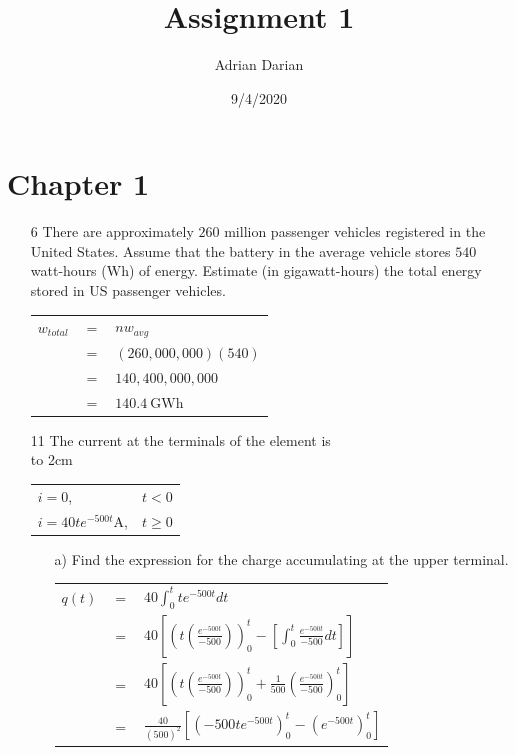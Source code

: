 \documentclass[a4paper]{article}
\title{Assignment 1}
\author{Adrian Darian}
\date{9/4/2020}
\newcommand\tab[1][0.5cm]{\hspace*{#1}}
\begin{document}
  
\maketitle
  
\section*{Chapter 1}
\begin{itemize}
	\item[6] There are approximately $260$ million passenger vehicles registered in the United States. Assume that the battery in the average vehicle stores $540$ watt-hours ($\si{\watt\hour}$) of energy. Estimate (in gigawatt-hours) the total energy stored in US passenger vehicles. \\
	      \begin{tabular}{r c l}
	      	$w_{total}$ & $=$ & $nw_{avg}$                    \\
	      	            & $=$ & $(260,000,000)(540)$          \\
	      	            & $=$ & $140,400,000,000$             \\
	      	            & $=$ & $\SI{140.4}{\giga\watt\hour}$ \\
	      \end{tabular} 
	\item[11] The current at the terminals of the element is \\
	      \hbox to 2cm{}
	      \tab\begin{tabular}{l c}
	      $i = 0$, & $t < 0$ \\
	      $i = 40te^{-500t}\si{\ampere}$, & $t \geq 0$
	\end{tabular}
	\begin{itemize}
		\item[a)] Find the expression for the charge accumulating at the upper terminal. \\
		      \begin{tabular}{r c l}
		      	$q(t)$ & $=$ & $40\int_{0}^t te^{-500t}dt$                                                           \\
		      	       & $=$ & $40[(t(\frac{e^{-500t}}{-500}))_{0}^t - [\int_{0}^t \frac{e^{-500t}}{-500}dt]]$       \\
		      	       & $=$ & $40[(t(\frac{e^{-500t}}{-500}))_{0}^t + \frac{1}{500}(\frac{e^{-500t}}{-500})_{0}^t]$ \\
		      	       & $=$ & $\frac{40}{(500)^2}[(-500te^{-500t})_{0}^t - (e^{-500t})_{0}^t]$                      \\

\end{tabular}
\end{itemize}
\end{itemize}
\end{document}
